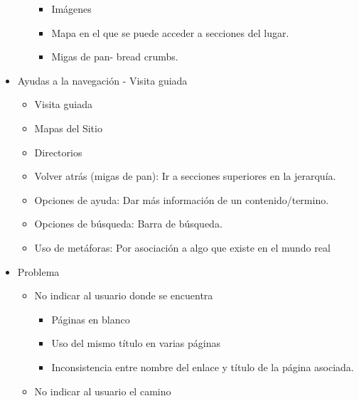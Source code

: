 \documentclass[12pt, twoside, openright]{report} %
\begin{document}
\begin{itemize}
\begin{itemize}
\begin{itemize}
			            \item Imágenes

			            \item Mapa en el que se puede acceder a secciones del lugar.

			            \item Migas de pan- bread crumbs.
		            \end{itemize}
	      \end{itemize}
	      \pagebreak
	\item Ayudas a la navegación - Visita guiada
	      \begin{itemize}
		      \item Visita guiada

		      \item Mapas del Sitio

		      \item Directorios

		      \item Volver atrás (migas de pan): Ir a secciones superiores en la jerarquía.

		      \item Opciones de ayuda: Dar más información de un contenido/termino.

		      \item Opciones de búsqueda: Barra de búsqueda.

		      \item Uso de metáforas: Por asociación a algo que existe en el mundo real
	      \end{itemize}
	\item Problema

	      \begin{itemize}
		      \item No indicar al usuario donde se encuentra

		            \begin{itemize}
			            \item Páginas en blanco

			            \item Uso del mismo título en varias páginas

			            \item Inconsistencia entre
			                  nombre del enlace y título de la página asociada.
		            \end{itemize}

		      \item No indicar al usuario el camino


\end{itemize}
\end{itemize}
\end{document}
